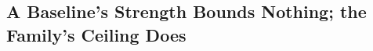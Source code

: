\subsection{A Baseline's Strength Bounds Nothing; the Family's Ceiling Does}
\label{sec:not_control_task}


